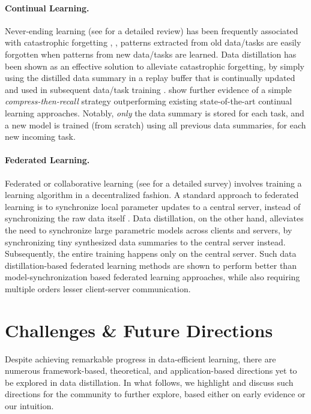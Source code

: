 \documentclass[10pt]{article} %
\begin{document}
\paragraph{Continual Learning.} Never-ending learning (see \citet{continual} for a detailed review) has been frequently associated with catastrophic forgetting \citep{catast_forgetting}, \ie, patterns extracted from old data/tasks are easily forgotten when patterns from new data/tasks are learned. Data distillation has been shown as an effective solution to alleviate catastrophic forgetting, by simply using the distilled data summary in a replay buffer that is continually updated and used in subsequent data/task training \citep{dd_continual_1, dd_continual_2, dd_continual_3}. \citet{remember_past} show further evidence of a simple \emph{compress-then-recall} strategy outperforming existing state-of-the-art continual learning approaches. Notably, \emph{only} the data summary is stored for each task, and a new model is trained (from scratch) using all previous data summaries, for each new incoming task.

\paragraph{Federated Learning.} Federated or collaborative learning (see \citet{federated_survey} for a detailed survey) involves training a learning algorithm in a decentralized fashion. A standard approach to federated learning is to synchronize local parameter updates to a central server, instead of synchronizing the raw data itself \citep{federated_sync_model}. Data distillation, on the other hand, alleviates the need to synchronize large parametric models across clients and servers, by synchronizing tiny synthesized data summaries to the central server instead. Subsequently, the entire training happens only on the central server. Such data distillation-based federated learning methods \citep{federated_distill_1, federated_distill_2, federated_distill_3, federated_distill_4, federated_distill_5, federated_distill_6} are shown to perform better than model-synchronization based federated learning approaches, while also requiring multiple orders lesser client-server communication.

\section{Challenges \& Future Directions} \label{sec:challenges_future_work}

Despite achieving remarkable progress in data-efficient learning, there are numerous framework-based, theoretical, and application-based directions yet to be explored in data distillation. In what follows, we highlight and discuss such directions for the community to further explore, based either on early evidence or our intuition. 
\end{document}
